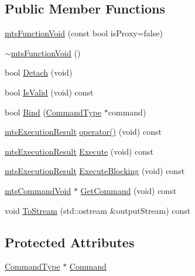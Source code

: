 \subsection*{Public Member Functions}
\begin{DoxyCompactItemize}
\item 
\hyperlink{classmts_function_void_ae83ab2874727476015fd013e8bc8fa3e}{mts\-Function\-Void} (const bool is\-Proxy=false)
\item 
\hyperlink{classmts_function_void_ae21d5d674eede40b132a5e34978e8137}{$\sim$mts\-Function\-Void} ()
\item 
bool \hyperlink{classmts_function_void_a1b129398698e60babfe28f4e82f778b1}{Detach} (void)
\item 
bool \hyperlink{classmts_function_void_a366d7b348e0fe6790067c6a5ab92f3f5}{Is\-Valid} (void) const 
\item 
bool \hyperlink{classmts_function_void_a03d9ae5c313a0464fac2fe99cd01be5f}{Bind} (\hyperlink{classmts_function_void_a76cc1c4742429e7cac7e4b73412f4cc9}{Command\-Type} $\ast$command)
\item 
\hyperlink{classmts_execution_result}{mts\-Execution\-Result} \hyperlink{classmts_function_void_aef53e6246e04936cd86021ff38ef13e3}{operator()} (void) const 
\item 
\hyperlink{classmts_execution_result}{mts\-Execution\-Result} \hyperlink{classmts_function_void_afdaa7e4b1247a986dc4bd54f1433cfd0}{Execute} (void) const 
\item 
\hyperlink{classmts_execution_result}{mts\-Execution\-Result} \hyperlink{classmts_function_void_a27c9f2b54e75a8b0ac1b9fc2b4acf766}{Execute\-Blocking} (void) const 
\item 
\hyperlink{classmts_command_void}{mts\-Command\-Void} $\ast$ \hyperlink{classmts_function_void_aee4d3326f9dd146aa565e0e3ce016068}{Get\-Command} (void) const 
\item 
void \hyperlink{classmts_function_void_a84d7f439003ba550206a265123d0fe16}{To\-Stream} (std\-::ostream \&output\-Stream) const 
\end{DoxyCompactItemize}
\subsection*{Protected Attributes}
\begin{DoxyCompactItemize}
\item 
\hyperlink{classmts_function_void_a76cc1c4742429e7cac7e4b73412f4cc9}{Command\-Type} $\ast$ \hyperlink{classmts_function_void_aa0384f1c3e204da6b625e520bbdef6c5}{Command}
\end{DoxyCompactItemize}
